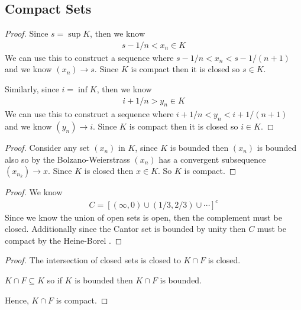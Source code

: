 \subsection{Compact Sets}

\begin{proof}
    Since $s=\sup K$, then we know 
    \begin{align*}
        s - 1/n < x_n \in K
    \end{align*}
    We can use this to construct a sequence where 
    $s - 1/n<x_n<s - 1/(n+1)$ and we know $(x_n)\rightarrow s$.
    Since $K$ is compact then it is closed so $s\in K$.

    Similarly, since $i=\inf K$, then we know 
    \begin{align*}
        i + 1/n > y_n \in K
    \end{align*}
    We can use this to construct a sequence where 
    $i + 1/n<y_n<i + 1/(n+1)$ and we know $(y_n)\rightarrow i$.
    Since $K$ is compact then it is closed so $i\in K$.
\end{proof}

\begin{proof}
    Consider any set $(x_n)$ in $K$, since $K$ is bounded then 
    $(x_n)$ is bounded also so by the Bolzano-Weierstrass \Thm
    $(x_n)$ has a convergent subsequence $(x_{n_k}) \rightarrow x$.
    Since $K$ is closed then $x\in K$. So $K$ is compact. 
\end{proof}

\begin{proof}
    We know
    \begin{align*}
        C = \left[ (\infty, 0) \cup (1/3,2/3) \cup \cdots \right]^c
    \end{align*}
    Since we know the union of open sets is open, then the complement must be closed.
    Additionally since the Cantor set is bounded by unity then $C$ must be 
    compact by the Heine-Borel \Thm.
\end{proof}

\begin{proof}
    The intersection of closed sets is closed to $K \cap F$ is closed.
    
    $K\cap F \subseteq K$ so if $K$ is bounded then $K\cap F$ is bounded.
    
    Hence, $K\cap F$ is compact.
\end{proof}


